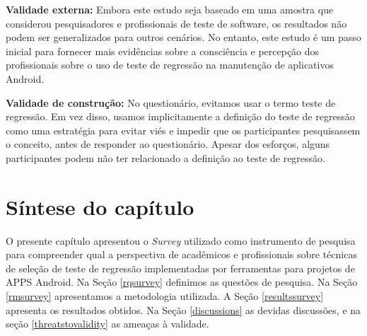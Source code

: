 \textbf{Validade externa:} Embora este estudo seja baseado em uma amostra que considerou pesquisadores e profissionais de teste de software, os resultados não podem ser generalizados para outros cenários. No entanto, este estudo é um passo inicial para fornecer mais evidências sobre a consciência e percepção dos profissionais sobre o uso de teste de regressão na manutenção de aplicativos Android. 

\textbf{Validade de construção:} No questionário,  evitamos usar o termo teste de regressão. Em vez disso, usamos implicitamente a definição do teste de regressão como uma estratégia para evitar viés e impedir que os participantes pesquisassem o conceito, antes de responder ao questionário. Apesar dos esforços, alguns participantes podem não ter relacionado a definição ao teste de regressão.


\section{Síntese do capítulo}

O presente capítulo apresentou o \textit{Survey} utilizado como instrumento de pesquisa para compreender qual a perspectiva de acadêmicos e profissionais sobre técnicas de seleção de teste de regressão implementadas por ferramentas para projetos de \ac{APPS} Android. Na Seção \ref{rqsurvey} definimos as questões de pesquisa. Na Seção \ref{rmsurvey} apresentamos a metodologia utilizada. A Seção \ref{resultssurvey} apresenta os resultados obtidos. Na Seção \ref{discussions} as devidas discussões, e na seção \ref{threatstovalidity} as ameaças à validade.





























